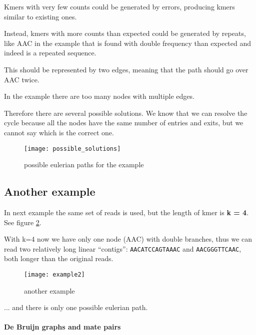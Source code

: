 Kmers with very few counts could be generated by errors, producing kmers
similar to existing ones.

Instead, kmers with more counts than expected could be generated by
repeats, like AAC in the example that is found with double frequency than
expected and indeed is a repeated sequence.

This should be represented by two edges, meaning that the path should go over
AAC twice.

In the example there are too many nodes with multiple edges.

Therefore there are several possible solutions.
We know that we can resolve the cycle because all the nodes have the 
same number of entries and exits, but we cannot say which is the correct one.

\begin{figure}[H]
  \centering
  \texttt{[image: possible\_solutions]}
  \caption{possible eulerian paths for the example}
  \label{fig:possible_solutions}
\end{figure}

\subsection{Another example}

In next example the same set of reads is used, but the length of kmer is
\textbf{k = 4}. See figure \ref{fig:example2}.

With k=4 now we have only one node (AAC) with double branches, 
thus we can read two relatively long linear “contigs”: 
\texttt{AACATCCAGTAAAC} and \texttt{AACGGGTTCAAC}, both longer than the
original reads. 

\begin{figure}[H]
  \centering
  \texttt{[image: example2]}
  \caption{another example}
  \label{fig:example2}
\end{figure}

... and there is only one possible eulerian path.

\paragraph*{De Bruijn graphs and mate pairs}

